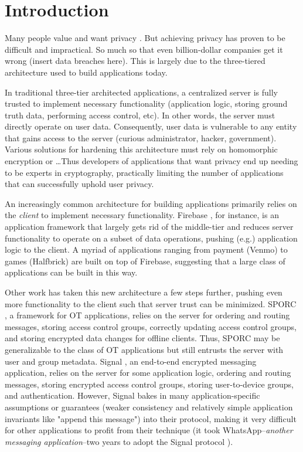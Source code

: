 \section{Introduction}

Many people value and want privacy \cite{}. But achieving privacy has proven to 
be difficult and impractical. So much so that even billion-dollar companies get 
it wrong (insert data breaches here). This is largely due to the three-tiered 
architecture used to build applications today. 

In traditional three-tier architected applications, a centralized server 
is fully trusted to implement necessary functionality (application logic, 
storing ground truth data, performing access control, etc). In other words, the 
server must directly operate on user data. Consequently, user data is 
vulnerable to any entity that gains access to the server (curious administrator, 
hacker, government). Various solutions for hardening this architecture must rely 
on homomorphic encryption \cite{cryptdb} or \dots Thus developers of 
applications that want privacy end up needing to be experts in cryptography, 
practically limiting the number of applications that can successfully uphold 
user privacy.

An increasingly common architecture for building applications primarily relies 
on the \textit{client} to implement necessary functionality. Firebase 
\cite{firebase}, for instance, is an application framework that largely gets 
rid of the middle-tier and reduces server functionality to operate on a subset 
of data operations, pushing (e.g.) application logic to the client. A myriad of 
applications ranging from payment (Venmo) to games (Halfbrick) are built on top 
of Firebase, suggesting that a large class of applications can be built in this 
way. 

Other work has taken this new architecture a few steps further, pushing even 
more functionality to the client such that server trust can be minimized. 
SPORC \cite{sporc}, a framework for OT applications, relies on the server 
for ordering and routing messages, storing access control groups, correctly 
updating access control groups, and storing encrypted data changes for offline
clients. Thus, SPORC may be generalizable to the class of OT applications but 
still entrusts the server with user and group metadata. Signal \cite{signal}, 
an end-to-end encrypted messaging application, relies on the server for some 
application logic, ordering and routing messages, storing encrypted access 
control groups, storing user-to-device groups, and authentication. However, 
Signal bakes in many application-specific assumptions or guarantees
(weaker consistency and relatively simple application invariants like "append 
this message") into their protocol, making it very difficult for other 
applications to profit from their technique (it took WhatsApp\---\textit{another
messaging application}\---two years to adopt the Signal protocol 
\cite{whatsapp_adopt_signal}).

